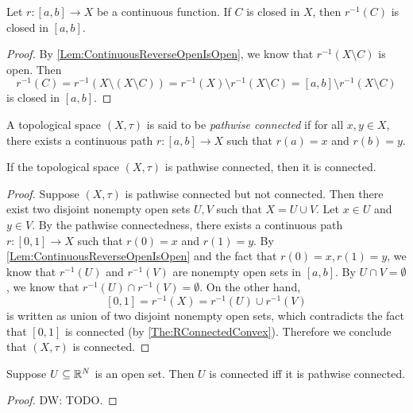 \documentclass[screen,single]{techreport}
\numberwithin{equation}{section}
\newcommand{\diw}[1]{{\color{Red} DW: #1}}
\begin{document}
\begin{proposition}\label{Prop:ContinuousReverseClosedIsClosed}
	Let $r : [a,b] \to X$ be a continuous function.
	If $C$ is closed in $X$, then $r^{-1}(C)$ is closed in $[a,b]$.
\end{proposition}
\begin{proof}
	By \cref{Lem:ContinuousReverseOpenIsOpen}, we know that $r^{-1}(X \setminus C)$ is open.
	Then
	\[
	r^{-1}(C) = r^{-1}(X \setminus (X \setminus C)) = r^{-1}(X) \setminus r^{-1}(X \setminus C) = [a,b] \setminus r^{-1}(X\setminus C)
	\]
	is closed in $[a,b]$.
\end{proof}

\begin{definition}\label{De:PathwiseConnected}
	A topological space $(X,\tau)$ is said to be \emph{pathwise connected} if for all $x,y \in X$, there exists a continuous path $r : [a,b] \to X$ such that $r(a) =x$ and $r(b)=y$.
\end{definition}

\begin{proposition}\label{Prop:PathWiseConnImplyConn}
	If the topological space $(X,\tau)$ is pathwise connected, then it is connected.
\end{proposition}
\begin{proof}
	Suppose $(X,\tau)$ is pathwise connected but not connected.
	Then there exist two disjoint nonempty open sets $U,V$ such that $X = U \cup V$.
	Let $x \in U$ and $y \in V$.
	By the pathwise connectedness, there exists a continuous path $r : [0,1] \to X$ such that $r(0)=x$ and $r(1)=y$.
	By \cref{Lem:ContinuousReverseOpenIsOpen} and the fact that $r(0)=x,r(1)=y$, we know that $r^{-1}(U)$ and $r^{-1}(V)$ are nonempty open sets in $[a,b]$.
	By $U \cap V = \emptyset$, we know that $r^{-1}(U) \cap r^{-1}(V) = \emptyset$.
	On the other hand,
	\[
	[0,1] = r^{-1}(X) = r^{-1}(U) \cup r^{-1}(V)
	\]
	is written as union of two disjoint nonempty open sets, which contradicts the fact that $[0,1]$ is connected (by \cref{The:RConnectedConvex}).
	Therefore we conclude that $(X,\tau)$ is connected.
\end{proof}

\begin{proposition}\label{Prop:OpenSetInEuclideanSpaceConn}
	Suppose $U \subseteq \mathbb{R}^N$ is an open set.
	Then $U$ is connected iff it is pathwise connected.
\end{proposition}
\begin{proof}
	\diw{TODO.}
\end{proof}
\end{document}
